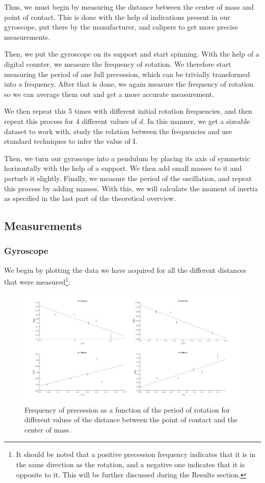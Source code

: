 \documentclass[a4paper,12pt]{article}
\begin{document}
Thus, we must begin by measuring the distance between the center of mass and point of contact. This is done with the help of indications present in our gyroscope, put there
by the manufacturer, and calipers to get more precise measurements.

Then, we put the gyroscope on its support and start spinning. With the help of a digital counter, we measure the frequency of rotation. 
We therefore start measuring the period of one full precession, which can be trivially transformed into a frequency. After that is done, we again measure the frequency of rotation so we can average them out and get a more accurate measurement.

We then repeat this 5 times with different initial rotation frequencies, and then repeat this process for 4 different values of $d$.
In this manner, we get a sizeable dataset to work with, study the relation between the frequencies and use standard techniques to infer the value of I. 

Then, we turn our gyroscope into a pendulum by placing its axis of symmetric horizontally with the help of a support. We then 
add small masses to it and perturb it slightly. Finally, we measure the period of the oscillation, and repeat this process by adding masses.
With this, we will calculate the moment of inertia as specified in the last part of the theoretical overview.

\subsection{Measurements}
\subsubsection{Gyroscope}
We begin by plotting the data we have acquired for all the different distances that were measured\footnote{It should be noted that a positive precession frequency indicates that it is in the same direction as the rotation, and a negative one indicates that it is opposite to it. This will be further discussed during the Results section.}:


\begin{figure}[h!]
	\label{foda}
	\caption{Frequency of precession as a function of the period of rotation for different values of the distance between the point of contact and the center of mass.}
	\includegraphics[width=\textwidth]{correct.jpg}
\end{figure} 
\end{document}
